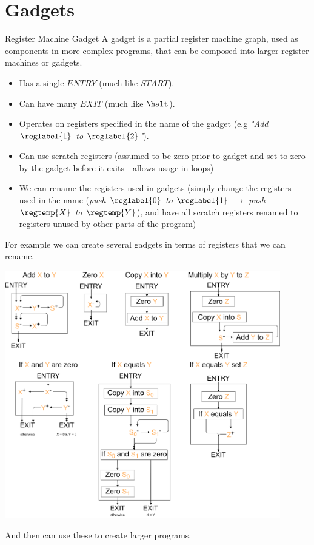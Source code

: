 \section{Gadgets}
\begin{definitionbox}{Register Machine Gadget}
	A gadget is a partial register machine graph, used as components in more complex programs, that can be composed into larger register machines or gadgets.
	\begin{itemize}
		\item Has a single $ENTRY$ (much like $START$).
		\item Can have many $EXIT$ (much like $\halt$).
		\item Operates on registers specified in the name of the gadget (e.g \textit{"Add $\reglabel{1}$ to $\reglabel{2}$"}).
		\item Can use scratch registers (assumed to be zero prior to gadget and set to zero by the gadget before it exits - allows usage in loops)
		\item We can rename the registers used in gadgets (simply change the registers used in the name (\textit{push $\reglabel{0}$ to $\reglabel{1}$ $\to$ push $\regtemp{X}$ to $\regtemp{Y}$}), and have all scratch registers renamed to registers unused by other parts of the program)
    \end{itemize}
	For example we can create several gadgets in terms of registers that we can rename.
    \begin{center}
        \includegraphics[width=0.9\textwidth]{register_machines/images/gadget.drawio.png}
    \end{center}
	And then can use these to create larger programs.
\end{definitionbox}

